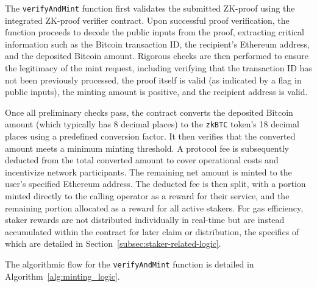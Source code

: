 \documentclass{DESSThesis}
\newcommand{\zktoken}{\texttt{zkBTC}}
\begin{document}
The \texttt{verifyAndMint} function first validates the submitted ZK-proof using the integrated ZK-proof verifier contract. Upon successful proof verification, the function proceeds to decode the public inputs from the proof, extracting critical information such as the Bitcoin transaction ID, the recipient's Ethereum address, and the deposited Bitcoin amount. Rigorous checks are then performed to ensure the legitimacy of the mint request, including verifying that the transaction ID has not been previously processed, the proof itself is valid (as indicated by a flag in public inputs), the minting amount is positive, and the recipient address is valid.

Once all preliminary checks pass, the contract converts the deposited Bitcoin amount (which typically has 8 decimal places) to the \texttt{\zktoken} token's 18 decimal places using a predefined conversion factor. It then verifies that the converted amount meets a minimum minting threshold. A protocol fee is subsequently deducted from the total converted amount to cover operational costs and incentivize network participants. The remaining net amount is minted to the user's specified Ethereum address. The deducted fee is then split, with a portion minted directly to the calling operator as a reward for their service, and the remaining portion allocated as a reward for all active stakers. For gas efficiency, staker rewards are not distributed individually in real-time but are instead accumulated within the contract for later claim or distribution, the specifics of which are detailed in Section~\ref{subsec:staker-related-logic}.

The algorithmic flow for the \texttt{verifyAndMint} function is detailed in Algorithm~\ref{alg:minting_logic}.
\end{document}
